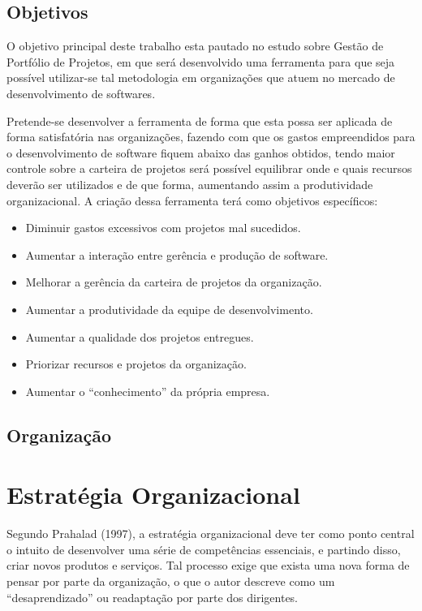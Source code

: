 \documentclass[12pt,a4paper,ruledheader,tocpage=prefix,floatnumber=continuous,pagestart=folhaderosto,font=times]{abnt}
\begin{document}
\section{Objetivos}
O objetivo principal deste trabalho esta pautado no estudo sobre Gestão de Portfólio de Projetos, em que será desenvolvido uma ferramenta para que
seja possível utilizar-se tal metodologia em organizações que atuem no mercado de desenvolvimento de softwares.

Pretende-se desenvolver a ferramenta de forma que esta possa ser aplicada de forma satisfatória nas organizações, fazendo com que os gastos
empreendidos para o desenvolvimento de software fiquem abaixo das ganhos obtidos, tendo maior controle sobre a carteira de projetos será possível
equilibrar onde e quais recursos deverão ser utilizados e de que forma, aumentando assim a produtividade organizacional. A criação dessa ferramenta
terá como objetivos específicos:

\begin{itemize}	
 \item Diminuir gastos excessivos com projetos mal sucedidos.
 \item Aumentar a interação entre gerência e produção de software.
 \item Melhorar a gerência da carteira de projetos da organização.
 \item Aumentar a produtividade da equipe de desenvolvimento.
 \item Aumentar a qualidade dos projetos entregues.
 \item Priorizar recursos e projetos da organização.
 \item Aumentar o “conhecimento” da própria empresa.
\end{itemize}

\section{Organização}

\chapter{Estratégia Organizacional}
Segundo Prahalad (1997), a estratégia organizacional deve ter como ponto central o intuito de desenvolver uma série de competências essenciais, e partindo
disso, criar novos produtos e serviços. Tal processo exige que exista uma nova forma de pensar por parte da organização, o que o autor descreve como um
``desaprendizado'' ou readaptação por parte dos dirigentes. 
\end{document}
